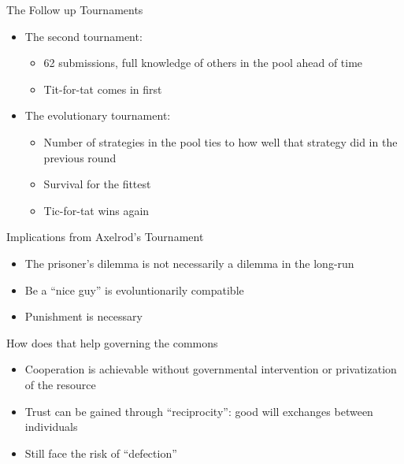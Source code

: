 \begin{frame}{The Follow up Tournaments}
\protect\hypertarget{the-follow-up-tournaments}{}

\begin{itemize}
\tightlist
\item
  The second tournament:

  \begin{itemize}
  \tightlist
  \item
    62 submissions, full knowledge of others in the pool ahead of time
  \item
    Tit-for-tat comes in first
  \end{itemize}
\item
  The evolutionary tournament:

  \begin{itemize}
  \tightlist
  \item
    Number of strategies in the pool ties to how well that strategy did
    in the previous round
  \item
    Survival for the fittest
  \item
    Tic-for-tat wins again
  \end{itemize}
\end{itemize}

\end{frame}

\begin{frame}{Implications from Axelrod's Tournament}
\protect\hypertarget{implications-from-axelrods-tournament}{}

\begin{itemize}
\tightlist
\item
  The prisoner's dilemma is not necessarily a dilemma in the long-run
\item
  Be a ``nice guy'' is evoluntionarily compatible
\item
  Punishment is necessary
\end{itemize}

\end{frame}

\begin{frame}{How does that help governing the commons}
\protect\hypertarget{how-does-that-help-governing-the-commons}{}

\begin{itemize}
\tightlist
\item
  Cooperation is achievable without governmental intervention or
  privatization of the resource
\item
  Trust can be gained through ``reciprocity'': good will exchanges
  between individuals
\item
  Still face the risk of ``defection''
\end{itemize}

\end{frame}

